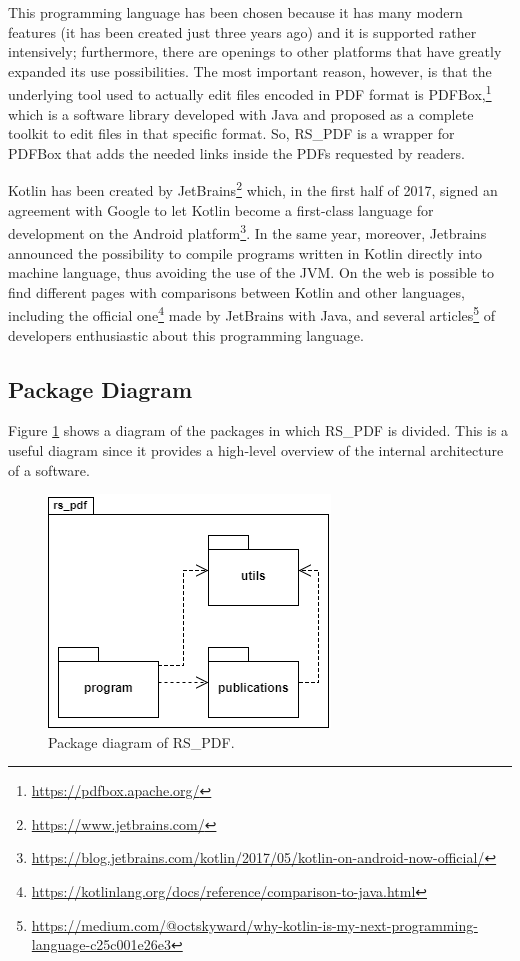 \documentclass[a4paper, english]{article}
\begin{document}
This programming language has been chosen because it has many modern features (it has been created just three years ago) and it is supported rather intensively; furthermore, there are openings to other platforms that have greatly expanded its use possibilities. The most important reason, however, is that the underlying tool used to actually edit files encoded in PDF format is PDFBox,\footnote{\url{https://pdfbox.apache.org/}} which is a software library  developed with Java and proposed as a complete toolkit to edit files in that specific format. So, RS\_PDF is a wrapper for PDFBox that adds the needed links inside the PDFs requested by readers. %

Kotlin has been created by JetBrains\footnote{\url{https://www.jetbrains.com/}} which, in the first half of 2017, signed an agreement with Google to let Kotlin become a first-class language for development on the Android platform\footnote{\url{https://blog.jetbrains.com/kotlin/2017/05/kotlin-on-android-now-official/}}. In the same year, moreover, Jetbrains announced the possibility to compile programs written in Kotlin directly into machine language, thus avoiding the use of the JVM. On the web is possible to find different pages with comparisons between Kotlin and other languages, including the official one\footnote{\url{https://kotlinlang.org/docs/reference/comparison-to-java.html}} made by JetBrains with Java, and several articles\footnote{\url{https://medium.com/@octskyward/why-kotlin-is-my-next-programming-language-c25c001e26e3}} of developers enthusiastic about this programming language.

\subsection{Package Diagram}

Figure \ref{fig:package} shows a diagram of the packages in which RS\_PDF is divided. This is a useful diagram since it provides a high-level overview of the internal architecture of a software.

\begin{figure}[!tbp]
\centering
\includegraphics[scale=0.7]{figures/package.png}
\caption{Package diagram of RS\_PDF.}
\label{fig:package}
\end{figure}
\end{document}
